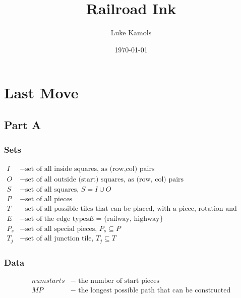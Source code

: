\documentclass[11pt,a4paper]{article}
\title{Railroad Ink}
\author{Luke Kamols}
\date{\today}
\begin{document}
\maketitle

\section*{Last Move}

\subsection*{Part A}

\subsubsection*{Sets}
\begin{align*}
I &- \textrm{set of all inside squares, as (row,col) pairs} \\
O &- \textrm{set of all outside (start) squares, as (row, col) pairs} \\
S &- \textrm{set of all squares, } S = I \cup O \\
P &- \textrm{set of all pieces} \\
T &- \textrm{set of all possible tiles that can be placed, with a piece, rotation and reflection} \\
E &- \textrm{set of the edge types} E = \{ \textrm{railway, highway} \} \\
P_s &- \textrm{set of all special pieces, } P_s \subseteq P \\
T_j &- \textrm{set of all junction tile, } T_j \subseteq T
\end{align*}

\subsubsection*{Data}
\begin{align*}
numstarts &- \textrm{ the number of start pieces} \\
MP &- \textrm{ the longest possible path that can be constructed}
\end{align*}
\end{document}
